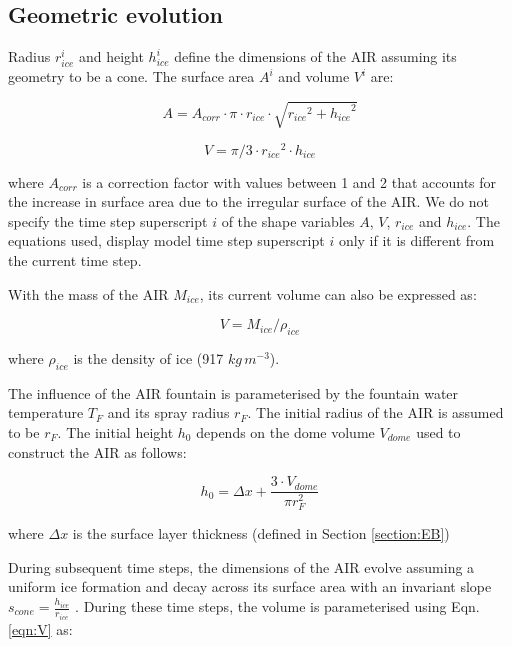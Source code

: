 \documentclass[utf8]{frontiersSCNS} %
\begin{document}
\subsection{Geometric evolution}

Radius $r_{ice}^i$ and height $h_{ice}^i$ define the dimensions of the AIR assuming its geometry to be a cone. The
surface area $A^i$ and volume $V^i$ are:

\begin{equation} A = A_{corr} \cdot \pi \cdot r_{ice} \cdot \sqrt{{r_{ice}}^2 + {h_{ice}}^ 2} \label{eqn:A} \end{equation}

\begin{equation} V = \pi/3 \cdot {r_{ice}}^2 \cdot h_{ice} \label{eqn:V} \end{equation}

where $A_{corr}$ is a correction factor with values between 1 and 2 that accounts for the increase in surface area
due to the irregular surface of the AIR. We do not specify the time step superscript $i$ of the shape variables
$A$, $V$, $r_{ice}$ and $h_{ice}$. The equations used, display model time step superscript $i$ only if it is
different from the current time step.

With the mass of the AIR $M_{ice}$, its current volume can also be expressed as:

\begin{equation} V = M_{ice} /\rho_{ice} \label{eqn:V1} \end{equation}

where $\rho_{ice}$ is the density of ice (917 $kg\, m^{-3}$).


The influence of the AIR fountain is parameterised by the fountain water temperature $T_{F}$ and its spray radius $r_F$.
The initial radius of the AIR is assumed to be $r_F$. The initial height $h_0$ depends on the dome volume $V_{dome}$
used to construct the AIR as follows:

\begin{equation}
	h_{0} =  \Delta x + \frac{3 \cdot V_{dome}}{\pi r_F^2 }
	\label{eqn:h0}
\end{equation}

where $\Delta x$ is the surface layer thickness (defined in Section \ref{section:EB})

During subsequent time steps, the dimensions of the AIR evolve assuming a uniform ice formation and decay across its
surface area with an invariant slope $s_{cone} = \frac{h_{ice}}{r_{ice}}$ .  During these time steps, the volume is
parameterised using Eqn. \ref{eqn:V} as:
\end{document}
